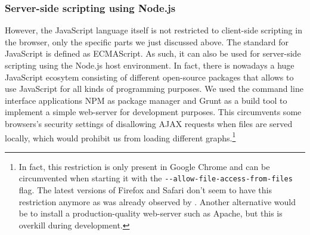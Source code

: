 \subsubsection{Server-side scripting using Node.js}
However, the JavaScript language itself is not restricted to client-side scripting in the  browser, only the specific parts we just discussed above. The standard for JavaScript is defined as ECMAScript. As such, it can also be used for server-side scripting using the Node.js host environment. In fact, there is nowadays a huge JavaScript ecosytem consisting of different open-source packages that allows to use JavaScript for all kinds of programming purposes. We used the command line interface applications NPM as package manager and Grunt as a build tool to implement a simple web-server for development purposes. This circumvents some browsers's security settings of disallowing AJAX requests when files are served locally, which would prohibit us from loading different graphs.\footnote{In fact, this restriction is only present in Google Chrome and can be circumvented when starting it with the \texttt{-{}-allow-file-access-from-files} flag. The latest versions of Firefox and Safari don't seem to have this restriction anymore as was already observed by \cite{feil2016idp}. Another alternative would be to install a production-quality web-server such as Apache, but this is overkill during development.}

